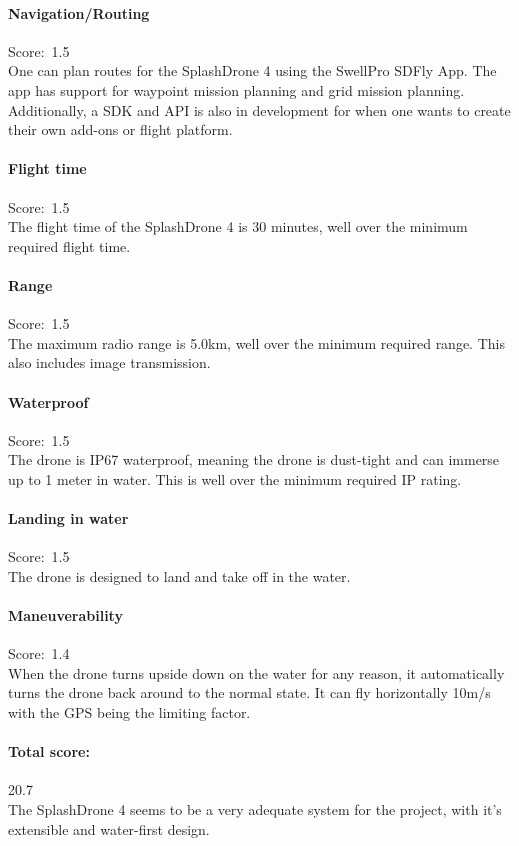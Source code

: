 \paragraph{Navigation/Routing}\mbox{Score: 1.5} \\
One can plan routes for the SplashDrone 4 using the SwellPro SDFly App. The app has support for waypoint mission planning and grid mission planning. Additionally, a SDK and API is also in development for when one wants to create their own add-ons or flight platform.

\paragraph{Flight time}\mbox{Score: 1.5} \\
The flight time of the SplashDrone 4 is 30 minutes, well over the minimum required flight time.

\paragraph{Range}\mbox{Score: 1.5} \\
The maximum radio range is 5.0km, well over the minimum required range. This also includes image transmission.

\paragraph{Waterproof}\mbox{Score: 1.5} \\
The drone is IP67 waterproof, meaning the drone is dust-tight and can immerse up to 1 meter in water. This is well over the minimum required IP rating.

\paragraph{Landing in water}\mbox{Score: 1.5} \\
The drone is designed to land and take off in the water.

\paragraph{Maneuverability}\mbox{Score: 1.4} \\
When the drone turns upside down on the water for any reason, it automatically turns the drone back around to the normal state. It can fly horizontally 10m/s with the GPS being the limiting factor.

\paragraph{Total score:}\mbox{20.7} \\
The SplashDrone 4 seems to be a very adequate system for the project, with it's extensible and water-first design.